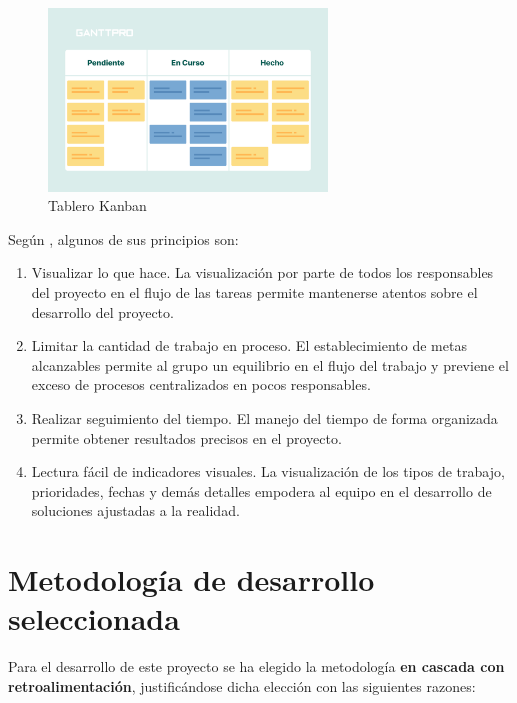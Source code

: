 \begin{itemize}
        \begin{figure}[h]
            \centering
            \includegraphics[width=0.66\textwidth]{figures/kanban.png}
            \caption[Tablero Kanban, extraído de \cite{stsepanets_metodo_2024}]{Tablero Kanban}
            \label{fig:metodologia:kanban}
        \end{figure}
        

        Según \cite{valtx_metodologias_2023}, algunos de sus principios son: 

        \begin{enumerate}
            \item Visualizar lo que hace. La visualización por parte de todos los responsables del proyecto en el flujo de las tareas permite mantenerse atentos sobre el desarrollo del proyecto.
            \item Limitar la cantidad de trabajo en proceso. El establecimiento de metas alcanzables permite al grupo un equilibrio en el flujo del trabajo y previene el exceso de procesos centralizados en pocos responsables.
            \item Realizar seguimiento del tiempo. El manejo del tiempo de forma organizada permite obtener resultados precisos en el proyecto.
            \item Lectura fácil de indicadores visuales. La visualización de los tipos de trabajo, prioridades, fechas y demás detalles empodera al equipo en el desarrollo de soluciones ajustadas a la realidad.
        \end{enumerate}
        
    \end{itemize}

\section{Metodología de desarrollo seleccionada}

Para el desarrollo de este proyecto se ha elegido la metodología \textbf{en cascada con retroalimentación}, justificándose dicha elección con las siguientes razones:


